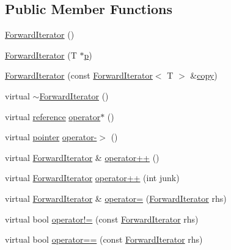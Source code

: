 \subsection*{Public Member Functions}
\begin{DoxyCompactItemize}
\item 
\hyperlink{classprism_1_1_forward_iterator_afb4641262fffdf091e86f0a7a7f7c081}{Forward\+Iterator} ()
\item 
\hyperlink{classprism_1_1_forward_iterator_a299beab946214925361571d60932d73c}{Forward\+Iterator} (T $\ast$\hyperlink{classprism_1_1_forward_iterator_a44e23472687df2dcf68780ba6173557a}{p})
\item 
\hyperlink{classprism_1_1_forward_iterator_a0074d4d447574ffcb3e5fb3a7e65f03d}{Forward\+Iterator} (const \hyperlink{classprism_1_1_forward_iterator}{Forward\+Iterator}$<$ T $>$ \&\hyperlink{namespaceprism_ae776f4cd825f79e7af1cf6ee1d90a209}{copy})
\item 
virtual \hyperlink{classprism_1_1_forward_iterator_acf0522ade2f87fca58f009036a906bcc}{$\sim$\+Forward\+Iterator} ()
\item 
virtual \hyperlink{classprism_1_1_forward_iterator_a4f7bff2c238f447c1537c74fe09f8935}{reference} \hyperlink{classprism_1_1_forward_iterator_ade3a6920b9b41d33e47bbe5f9b3263b5}{operator$\ast$} ()
\item 
virtual \hyperlink{classprism_1_1_forward_iterator_af50dd6e13f3cea3ee3b2332e48996502}{pointer} \hyperlink{classprism_1_1_forward_iterator_a8ec70818980d62bc629d220bb8d54dc8}{operator-\/$>$} ()
\item 
virtual \hyperlink{classprism_1_1_forward_iterator}{Forward\+Iterator} \& \hyperlink{classprism_1_1_forward_iterator_af49be3da85db82c7e257131184df16de}{operator++} ()
\item 
virtual \hyperlink{classprism_1_1_forward_iterator}{Forward\+Iterator} \hyperlink{classprism_1_1_forward_iterator_a94acbaa5cf9777c760e8080a9bfe714e}{operator++} (int junk)
\item 
virtual \hyperlink{classprism_1_1_forward_iterator}{Forward\+Iterator} \& \hyperlink{classprism_1_1_forward_iterator_a3426335fb087ac914902e5b94717de99}{operator=} (\hyperlink{classprism_1_1_forward_iterator}{Forward\+Iterator} rhs)
\item 
virtual bool \hyperlink{classprism_1_1_forward_iterator_a38ace2c6e529bc58cc8cf6b933d579a0}{operator!=} (const \hyperlink{classprism_1_1_forward_iterator}{Forward\+Iterator} rhs)
\item 
virtual bool \hyperlink{classprism_1_1_forward_iterator_a24028fff385dcae1ce13a28ec3d92f6b}{operator==} (const \hyperlink{classprism_1_1_forward_iterator}{Forward\+Iterator} rhs)
\end{DoxyCompactItemize}
